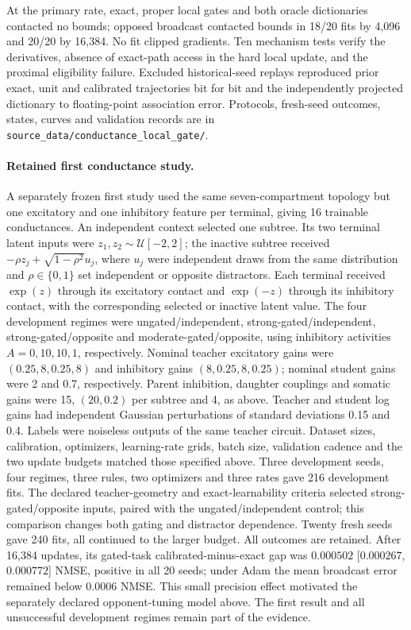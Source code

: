 At the primary rate, exact, proper local gates and both oracle dictionaries contacted no bounds; opposed broadcast contacted bounds in 18/20 fits by 4,096 and 20/20 by 16,384. No fit clipped gradients. Ten mechanism tests verify the derivatives, absence of exact-path access in the hard local update, and the proximal eligibility failure. Excluded historical-seed replays reproduced prior exact, unit and calibrated trajectories bit for bit and the independently projected dictionary to floating-point association error. Protocols, fresh-seed outcomes, states, curves and validation records are in \texttt{source\_data/conductance\_local\_gate/}.

\paragraph{Retained first conductance study.}
A separately frozen first study used the same seven-compartment topology but one excitatory and one inhibitory feature per terminal, giving 16 trainable conductances. An independent context selected one subtree. Its two terminal latent inputs were $z_1,z_2\sim\mathcal U[-2,2]$; the inactive subtree received $-\rho z_j+\sqrt{1-\rho^2}u_j$, where $u_j$ were independent draws from the same distribution and $\rho\in\{0,1\}$ set independent or opposite distractors. Each terminal received $\exp(z)$ through its excitatory contact and $\exp(-z)$ through its inhibitory contact, with the corresponding selected or inactive latent value. The four development regimes were ungated/independent, strong-gated/independent, strong-gated/opposite and moderate-gated/opposite, using inhibitory activities $A=0,10,10,1$, respectively. Nominal teacher excitatory gains were $(0.25,8,0.25,8)$ and inhibitory gains $(8,0.25,8,0.25)$; nominal student gains were 2 and 0.7, respectively. Parent inhibition, daughter couplings and somatic gains were 15, $(20,0.2)$ per subtree and 4, as above. Teacher and student log gains had independent Gaussian perturbations of standard deviations 0.15 and 0.4. Labels were noiseless outputs of the same teacher circuit. Dataset sizes, calibration, optimizers, learning-rate grids, batch size, validation cadence and the two update budgets matched those specified above. Three development seeds, four regimes, three rules, two optimizers and three rates gave 216 development fits. The declared teacher-geometry and exact-learnability criteria selected strong-gated/opposite inputs, paired with the ungated/independent control; this comparison changes both gating and distractor dependence. Twenty fresh seeds gave 240 fits, all continued to the larger budget. All outcomes are retained. After 16,384 updates, its gated-task calibrated-minus-exact gap was $0.000502$ [$0.000267$, $0.000772$] NMSE, positive in all 20 seeds; under Adam the mean broadcast error remained below 0.0006 NMSE. This small precision effect motivated the separately declared opponent-tuning model above. The first result and all unsuccessful development regimes remain part of the evidence.
